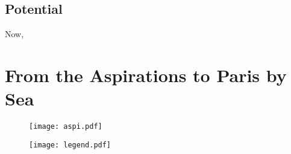 \subsection{Potential}
\label{s:potential}

Now, 



\section{From the Aspirations to Paris by Sea}

\begin{figure}[!htb]
\centering
  \texttt{[image: aspi.pdf]}
\end{figure}



\begin{figure}[!htb]
\centering
  \texttt{[image: legend.pdf]}
\end{figure}

\stopcontents[chapters]
